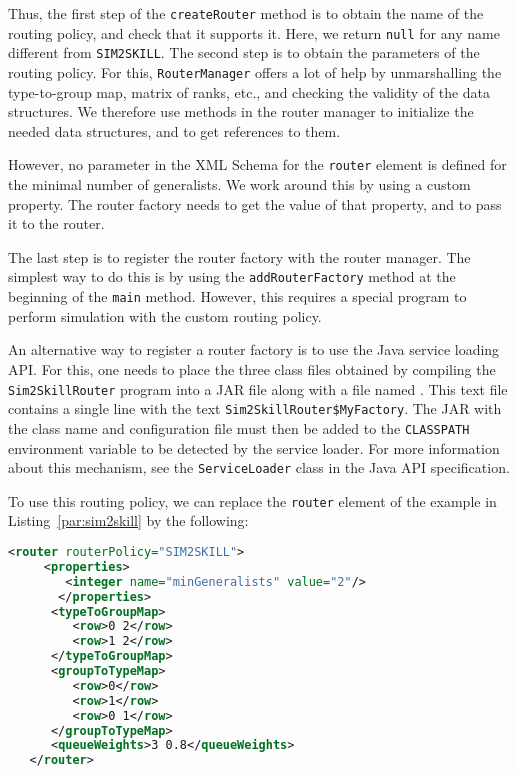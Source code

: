 Thus, the first step of the \texttt{create\-Router} method is to
obtain the name of the routing policy, and check that it supports it.
Here, we return \texttt{null} for any name different from
\texttt{SIM2SKILL}.
The second step is to obtain the parameters of the routing policy.
For this, \texttt{Router\-Manager} offers a lot of help by
unmarshalling the type-to-group map, matrix of ranks, etc., and
checking the validity of the data structures.
We therefore use methods in the router manager to initialize the
needed data structures, and to get references to them.

However, no parameter in the XML Schema for the \texttt{router}
element is defined for the minimal number of generalists.
We work around this by using a custom property.
The router factory needs to get the value of that property, and to
pass it to the
router.

The last step is to register the router factory with the router
manager.
The simplest way to do this is by using the
\texttt{add\-Router\-Factory} method at the beginning of the
\texttt{main} method. However, this requires a special program to
perform simulation with the custom routing policy.

An alternative way to register a router factory is to use the Java
service loading API.
For this, one needs to place the three class files obtained by
compiling
the \texttt{Sim2SkillRouter} program into a JAR file along with a file
named
.
This text file contains a single line with the text
\texttt{Sim2SkillRouter\$MyFactory}.
The JAR with the class name and configuration file must then be added
to the \texttt{CLASSPATH} environment variable to be detected by the
service loader.
For more information about this mechanism, see the
\texttt{Service\-Loader} class in the Java API specification.

To use this routing policy, we can replace the \texttt{router} element
of
the example in Listing~\ref{par:sim2skill} by the following:
\begin{lstlisting}[language=XML]
   <router routerPolicy="SIM2SKILL">
     <properties>
        <integer name="minGeneralists" value="2"/>
       </properties>
      <typeToGroupMap>
         <row>0 2</row>
         <row>1 2</row>
      </typeToGroupMap>
      <groupToTypeMap>
         <row>0</row>
         <row>1</row>
         <row>0 1</row>
      </groupToTypeMap>
      <queueWeights>3 0.8</queueWeights>
   </router>
\end{lstlisting}


